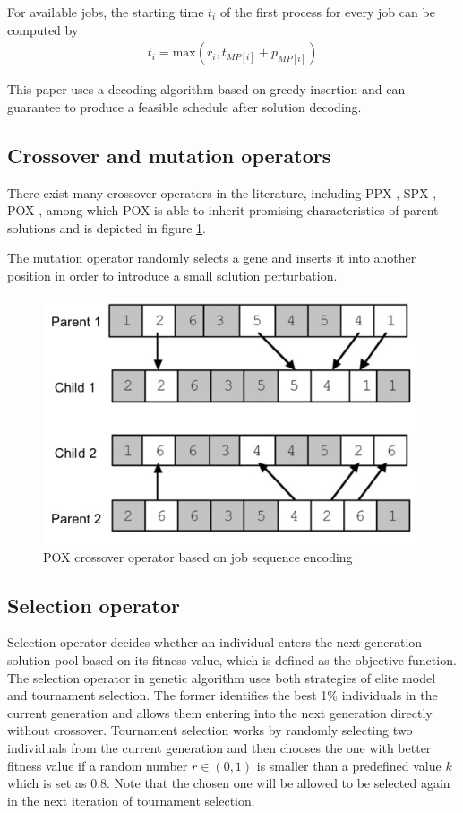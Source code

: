 For available jobs, the starting time $t_i$ of the first process for every job can be computed by 
\begin{align}
	t_i = \text{max}(r_i, t_{MP[i]} + p_{MP[i]})
\end{align}

This paper uses a decoding algorithm based on greedy insertion and can guarantee to produce a feasible schedule after solution decoding.

\subsection{Crossover and mutation operators}
There exist many crossover operators in the literature, including PPX \citep{cheng1999tutorial4}, SPX \citep{wang2001effective5}, POX \citep{zhang6}, among which POX is able to inherit promising characteristics of parent solutions and is depicted in figure \ref{fig:fig1}.

The mutation operator randomly selects a gene and inserts it into another position in order to introduce a small solution perturbation.


\begin{figure}[h!]
	\begin{center}
		\includegraphics[width=0.4\linewidth]{sections/figure1.jpg}
		\caption{POX crossover operator based on job sequence encoding}
		\label{fig:fig1}
	\end{center}
\end{figure}

\subsection{Selection operator}
Selection operator decides whether an individual enters the next generation solution pool based on its fitness value, which is defined as the objective function.
The selection operator in genetic algorithm uses both strategies of elite model and tournament selection.
The former identifies the best 1\% individuals in the current generation and allows them entering into the next generation directly without crossover.
Tournament selection works by randomly selecting two individuals from the current generation and then chooses the one with better fitness value if a random number $r \in (0,1)$ is smaller than a predefined value $k$ which is set as 0.8. 
Note that the chosen one will be allowed to be selected again in the next iteration of tournament selection.



